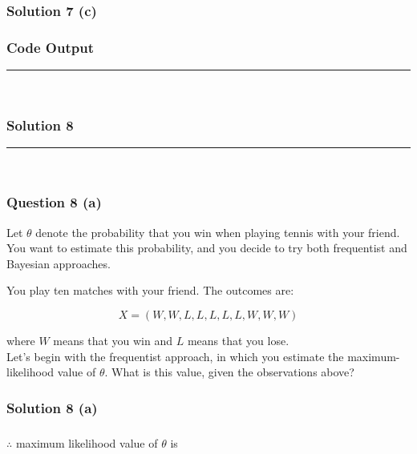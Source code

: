 \documentclass{article}
\begin{document}
\subsubsection*{Solution 7 (c)}
\subsubsection*{Code Output}




\noindent\rule{\textwidth}{0.4pt}\\

\newpage

\subsubsection*{Solution 8}
\noindent\rule{\textwidth}{0.4pt}\\
\subsubsection*{Question 8 (a)}
\begin{flushleft}
Let $\theta$ denote the probability that you win when playing tennis with your friend. You want to estimate this probability, and you decide to try both frequentist and Bayesian approaches.

You play ten matches with your friend. The outcomes are:
\end{flushleft}
$$X = (W, W, L, L, L, L, L, W, W, W)$$

\begin{flushleft}
where $W$ means that you win and $L$ means that you lose.\\
Let's begin with the frequentist approach, in which you estimate the maximum-likelihood value of $\theta$. What is this value, given the observations above?

\end{flushleft}

\subsubsection*{Solution 8 (a)}

\subsubsection*{\normalfont}{$\therefore$ maximum likelihood value of $\theta$ is} \\
\end{document}
